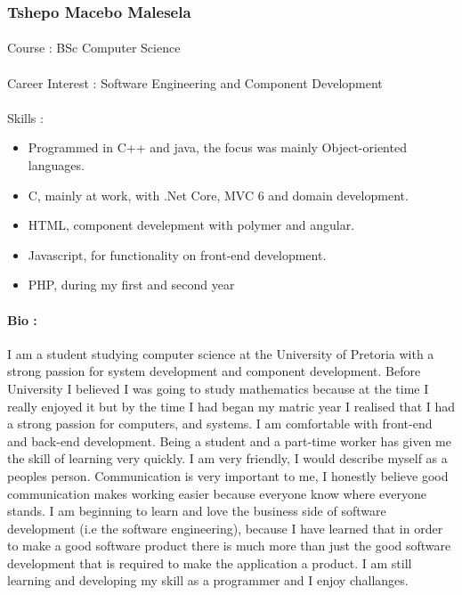 \documentclass[11pt]{article}
\begin{document}
\subsubsection{Tshepo Macebo Malesela}
\paragraph{}Course : BSc Computer Science
\paragraph{}Career Interest : Software Engineering and Component Development
\paragraph{}Skills : 
\begin{itemize}
\item Programmed in C++ and java, the focus was mainly Object-oriented languages.
\item C, mainly at work, with .Net Core, MVC 6 and domain development.
\item HTML, component develepment with polymer and angular.
\item Javascript, for functionality on front-end development.
\item PHP, during my first and second year
\end{itemize}
\paragraph{Bio :} I am a student studying computer science at the University of Pretoria with a strong passion for system development and component development. Before University I believed I was going to study mathematics because at the time I really enjoyed it but by the time I had began my matric year I realised that I had a strong passion for computers, and systems. I am comfortable with front-end and back-end development. Being a student and a part-time worker has given me the skill of learning very quickly. I am very friendly, I would describe myself as a peoples person. Communication is very important to me, I honestly believe good communication makes working easier because everyone know where everyone stands. I am beginning to learn and love the business side of software development (i.e the software engineering), because I have learned that in order to make a good software product there is much more than just the good software development that is required to make the application a product. I am still learning and developing my skill as a programmer and I enjoy challanges.
\end{document}
